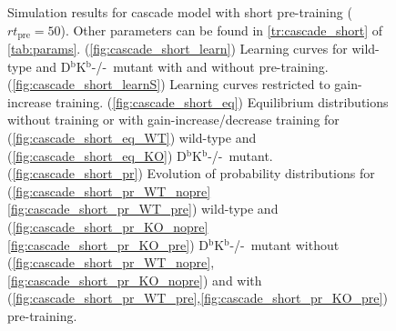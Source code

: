 \documentclass[12pt]{article}
\newcommand{\KO}{D$^\mathrm{b}$K$^\mathrm{b}$-/-}
\begin{document}
\begin{figure}
 \begin{center}
 \begin{myenuma}
  \item{}\label{fig:cascade_short_learn}
  \item{}\label{fig:cascade_short_learnS}
  \item\label{fig:cascade_short_eq}\begin{myenumi}
                    \item{}\label{fig:cascade_short_eq_WT}
                    \item{}\label{fig:cascade_short_eq_KO}
                  \end{myenumi}
  \item\label{fig:cascade_short_pr}\begin{myenumi}
                    \item{}\label{fig:cascade_short_pr_WT_nopre}
                    \item{}\label{fig:cascade_short_pr_WT_pre}
                    \item{}\label{fig:cascade_short_pr_KO_nopre}
                    \item{}\label{fig:cascade_short_pr_KO_pre}
                  \end{myenumi}
 \end{myenuma}
 \end{center}
  \caption{Simulation results for cascade model with short pre-training ($rt_\text{pre}=50$).
  Other parameters can be found in \autoref{tr:cascade_short} of \autoref{tab:params}.
  (\ref{fig:cascade_short_learn}) Learning curves for wild-type and \KO\ mutant with and without pre-training.
  (\ref{fig:cascade_short_learnS}) Learning curves restricted to gain-increase training.
  (\ref{fig:cascade_short_eq}) Equilibrium distributions without training or with gain-increase/decrease training for (\ref{fig:cascade_short_eq_WT}) wild-type and (\ref{fig:cascade_short_eq_KO}) \KO\ mutant.
  (\ref{fig:cascade_short_pr}) Evolution of probability distributions for (\ref{fig:cascade_short_pr_WT_nopre}\ref{fig:cascade_short_pr_WT_pre}) wild-type and  (\ref{fig:cascade_short_pr_KO_nopre}\ref{fig:cascade_short_pr_KO_pre}) \KO\ mutant without (\ref{fig:cascade_short_pr_WT_nopre},\ref{fig:cascade_short_pr_KO_nopre}) and with (\ref{fig:cascade_short_pr_WT_pre},\ref{fig:cascade_short_pr_KO_pre}) pre-training. } \label{fig:cascade_short}
\end{figure}
\end{document}
